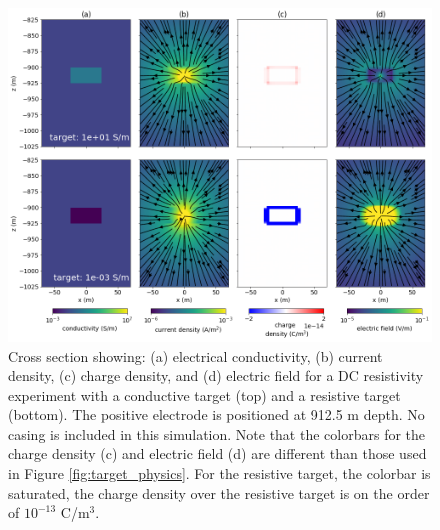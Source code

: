 \begin{figure}
    \begin{center}
    \includegraphics[width=\textwidth]{figures/dc_casing/uncased_target_physics.png}
    \end{center}
\caption{
    Cross section showing: (a) electrical conductivity, (b) current density, (c) charge density, and
    (d) electric field for a DC resistivity experiment with a conductive target (top) and a resistive target
    (bottom). The positive electrode is positioned at 912.5 m depth.
    No casing is included in this simulation. Note that the colorbars for the charge density (c) and electric field (d)
    are different than those used in Figure \ref{fig:target_physics}. For the resistive target, the colorbar is saturated,
    the charge density over the resistive target is on the order of $10^{-13}$ C/m$^3$.
}
\label{fig:uncased_target_physics}
\end{figure}
